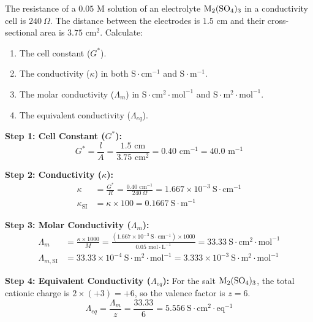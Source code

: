 \begin{examplebox}
The resistance of a $0.05\text{ M}$ solution of an electrolyte $\ce{M2(SO4)3}$ in a conductivity cell is $240\ \Omega$. The distance between the electrodes is $1.5\text{ cm}$ and their cross-sectional area is $3.75\text{ cm}^2$. Calculate:
\begin{enumerate}[label=(\alph*)]
    \item The cell constant ($G^*$).
    \item The conductivity ($\kappa$) in both $\text{S}\cdot\text{cm}^{-1}$ and $\text{S}\cdot\text{m}^{-1}$.
    \item The molar conductivity ($\Lambda_m$) in $\text{S}\cdot\text{cm}^2\cdot\text{mol}^{-1}$ and $\text{S}\cdot\text{m}^2\cdot\text{mol}^{-1}$.
    \item The equivalent conductivity ($\Lambda_{eq}$).
\end{enumerate}
\tcblower
\textbf{Step 1: Cell Constant ($G^*$):}
\begin{equation*}
    G^* = \frac{l}{A} = \frac{1.5\text{ cm}}{3.75\text{ cm}^2} = 0.40\text{ cm}^{-1} = 40.0\text{ m}^{-1}
\end{equation*}

\textbf{Step 2: Conductivity ($\kappa$):}
\begin{align*}
    \kappa &= \frac{G^*}{R} = \frac{0.40\text{ cm}^{-1}}{240\ \Omega} = 1.667 \times 10^{-3}\ \text{S}\cdot\text{cm}^{-1} \\
    \kappa_{\text{SI}} &= \kappa \times 100 = 0.1667\ \text{S}\cdot\text{m}^{-1}
\end{align*}

\textbf{Step 3: Molar Conductivity ($\Lambda_m$):}
\begin{align*}
    \Lambda_m &= \frac{\kappa \times 1000}{M} = \frac{(1.667 \times 10^{-3}\ \text{S}\cdot\text{cm}^{-1}) \times 1000}{0.05\text{ mol}\cdot\text{L}^{-1}} = 33.33\ \text{S}\cdot\text{cm}^2\cdot\text{mol}^{-1} \\
    \Lambda_{m,\text{SI}} &= 33.33 \times 10^{-4}\ \text{S}\cdot\text{m}^2\cdot\text{mol}^{-1} = 3.333 \times 10^{-3}\ \text{S}\cdot\text{m}^2\cdot\text{mol}^{-1}
\end{align*}

\textbf{Step 4: Equivalent Conductivity ($\Lambda_{eq}$):}
For the salt $\ce{M2(SO4)3}$, the total cationic charge is $2 \times (+3) = +6$, so the valence factor is $z = 6$.
\begin{equation*}
    \Lambda_{eq} = \frac{\Lambda_m}{z} = \frac{33.33}{6} = 5.556\ \text{S}\cdot\text{cm}^2\cdot\text{eq}^{-1}
\end{equation*}
\end{examplebox}

